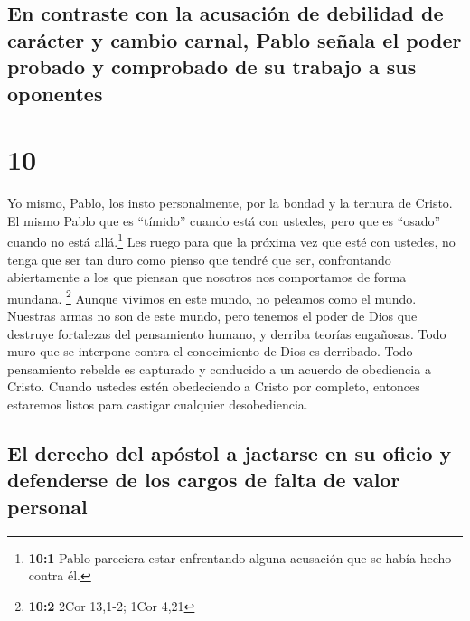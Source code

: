 \hypertarget{en-contraste-con-la-acusaciuxf3n-de-debilidad-de-caruxe1cter-y-cambio-carnal-pablo-seuxf1ala-el-poder-probado-y-comprobado-de-su-trabajo-a-sus-oponentes}{%
\subsection{En contraste con la acusación de debilidad de carácter y
cambio carnal, Pablo señala el poder probado y comprobado de su trabajo
a sus
oponentes}\label{en-contraste-con-la-acusaciuxf3n-de-debilidad-de-caruxe1cter-y-cambio-carnal-pablo-seuxf1ala-el-poder-probado-y-comprobado-de-su-trabajo-a-sus-oponentes}}

\hypertarget{section-9}{%
\section{10}\label{section-9}}

 Yo mismo, Pablo, los insto personalmente, por la bondad y
la ternura de Cristo. El mismo Pablo que es ``tímido'' cuando está con
ustedes, pero que es ``osado'' cuando no está allá.\footnote{\textbf{10:1}
  Pablo pareciera estar enfrentando alguna acusación que se había hecho
  contra él.}  Les ruego para que la próxima vez que esté
con ustedes, no tenga que ser tan duro como pienso que tendré que ser,
confrontando abiertamente a los que piensan que nosotros nos comportamos
de forma mundana. \footnote{\textbf{10:2} 2Cor 13,1-2; 1Cor 4,21}
 Aunque vivimos en este mundo, no peleamos como el mundo.
 Nuestras armas no son de este mundo, pero tenemos el
poder de Dios que destruye fortalezas del pensamiento humano, y derriba
teorías engañosas.  Todo muro que se interpone contra el
conocimiento de Dios es derribado. Todo pensamiento rebelde es capturado
y conducido a un acuerdo de obediencia a Cristo.  Cuando
ustedes estén obedeciendo a Cristo por completo, entonces estaremos
listos para castigar cualquier desobediencia.

\hypertarget{el-derecho-del-apuxf3stol-a-jactarse-en-su-oficio-y-defenderse-de-los-cargos-de-falta-de-valor-personal}{%
\subsection{El derecho del apóstol a jactarse en su oficio y defenderse
de los cargos de falta de valor
personal}\label{el-derecho-del-apuxf3stol-a-jactarse-en-su-oficio-y-defenderse-de-los-cargos-de-falta-de-valor-personal}}

